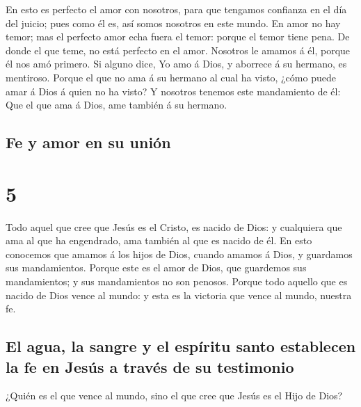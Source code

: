  En esto es perfecto el amor con nosotros, para que
tengamos confianza en el día del juicio; pues como él es, así somos
nosotros en este mundo.  En amor no hay temor; mas el
perfecto amor echa fuera el temor: porque el temor tiene pena. De donde
el que teme, no está perfecto en el amor.  Nosotros le
amamos á él, porque él nos amó primero.  Si alguno dice,
Yo amo á Dios, y aborrece á su hermano, es mentiroso. Porque el que no
ama á su hermano al cual ha visto, ¿cómo puede amar á Dios á quien no ha
visto?  Y nosotros tenemos este mandamiento de él: Que el
que ama á Dios, ame también á su hermano.

\hypertarget{fe-y-amor-en-su-uniuxf3n}{%
\subsection{Fe y amor en su unión}\label{fe-y-amor-en-su-uniuxf3n}}

\hypertarget{section-62-5}{%
\section{5}\label{section-62-5}}

 Todo aquel que cree que Jesús es el Cristo, es nacido de
Dios: y cualquiera que ama al que ha engendrado, ama también al que es
nacido de él.  En esto conocemos que amamos á los hijos de
Dios, cuando amamos á Dios, y guardamos sus mandamientos. 
Porque este es el amor de Dios, que guardemos sus mandamientos; y sus
mandamientos no son penosos.  Porque todo aquello que es
nacido de Dios vence al mundo: y esta es la victoria que vence al mundo,
nuestra fe.

\hypertarget{el-agua-la-sangre-y-el-espuxedritu-santo-establecen-la-fe-en-jesuxfas-a-travuxe9s-de-su-testimonio}{%
\subsection{El agua, la sangre y el espíritu santo establecen la fe en
Jesús a través de su
testimonio}\label{el-agua-la-sangre-y-el-espuxedritu-santo-establecen-la-fe-en-jesuxfas-a-travuxe9s-de-su-testimonio}}

 ¿Quién es el que vence al mundo, sino el que cree que
Jesús es el Hijo de Dios?

